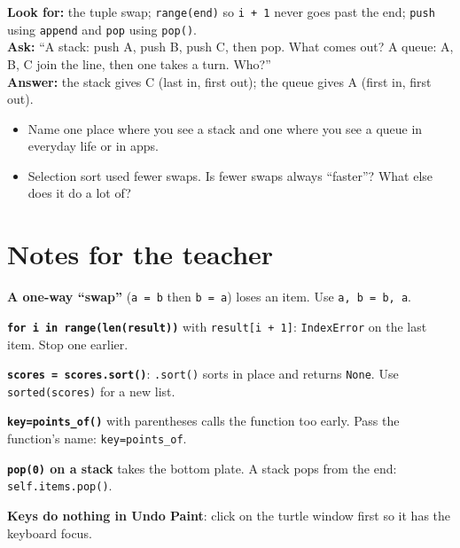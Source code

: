 \begin{formativecheck}
\textbf{Look for:} the tuple swap; \texttt{range(end)} so \texttt{i + 1} never goes past the end; \texttt{push} using \texttt{append} and \texttt{pop} using \texttt{pop()}.\\
\textbf{Ask:} \enquote{A stack: push A, push B, push C, then pop. What comes out? A queue: A, B, C join the line, then one takes a turn. Who?}\\
\textbf{Answer:} the stack gives C (last in, first out); the queue gives A (first in, first out).
\end{formativecheck}

\begin{reflection}
\begin{itemize}[itemsep=1pt]
  \item Name one place where you see a stack and one where you see a queue in everyday life or in apps.
  \item Selection sort used fewer swaps. Is fewer swaps always \enquote{faster}? What else does it do a lot of?
\end{itemize}
\end{reflection}

\section{Notes for the teacher}
\begin{commonmistakes}
  \item \textbf{A one-way \enquote{swap}} (\texttt{a = b} then \texttt{b = a}) loses an item. Use \texttt{a, b = b, a}.
  \item \textbf{\texttt{for i in range(len(result))}} with \texttt{result[i + 1]}: \texttt{IndexError} on the last item. Stop one earlier.
  \item \textbf{\texttt{scores = scores.sort()}}: \texttt{.sort()} sorts in place and returns \texttt{None}. Use \texttt{sorted(scores)} for a new list.
  \item \textbf{\texttt{key=points\_of()}} with parentheses calls the function too early. Pass the function's name: \texttt{key=points\_of}.
  \item \textbf{\texttt{pop(0)} on a stack} takes the bottom plate. A stack pops from the end: \texttt{self.items.pop()}.
  \item \textbf{Keys do nothing in Undo Paint}: click on the turtle window first so it has the keyboard focus.
\end{commonmistakes}

